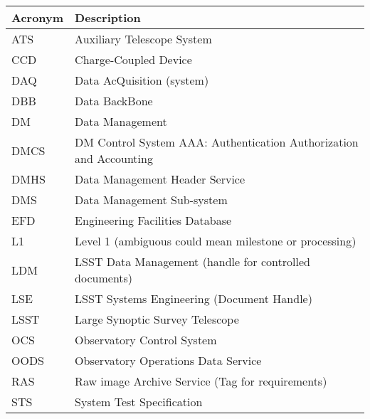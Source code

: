 \addtocounter{table}{-1}
\begin{longtable}{|l|p{}|}\hline
\textbf{Acronym} & \textbf{Description}  \\\hline

ATS & Auxiliary Telescope System \\\hline
CCD & Charge-Coupled Device \\\hline
DAQ & Data AcQuisition (system) \\\hline
DBB & Data BackBone \\\hline
DM & Data Management \\\hline
DMCS & DM Control System AAA: Authentication Authorization and Accounting \\\hline
DMHS & Data Management Header Service \\\hline
DMS & Data Management Sub-system \\\hline
EFD & Engineering Facilities Database \\\hline
L1 & Level 1 (ambiguous could mean milestone or processing) \\\hline
LDM & LSST Data Management (handle for controlled documents) \\\hline
LSE & LSST Systems Engineering (Document Handle) \\\hline
LSST & Large Synoptic Survey Telescope \\\hline
OCS & Observatory Control System \\\hline
OODS & Observatory Operations Data Service \\\hline
RAS & Raw image Archive Service (Tag for requirements) \\\hline
STS & System Test Specification \\\hline
\end{longtable}
